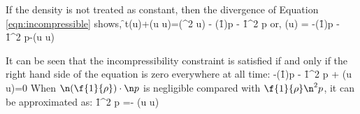 If the density is not treated as constant, then the divergence of Equation \ref{eqn:incompressible} shows,
\be
\f{\p }{\p t}(\di \+u)+\di (\+u \cdot \n \+u)=\nu \di (\n^2 \+u) - \n (\f{1}{\rho})\cdot \n p - \f{1}{\rho}\n^2 p
\ee
or,
\be
[\f{\p }{\p t}+\nu \n^2](\di \+u) = -\n (\f{1}{\rho})\cdot \n p - \f{1}{\rho}\n^2 p-\di (\+u \cdot \n \+u)
\ee

It can be seen that the incompressibility constraint is satisfied if and only if the right hand side of the equation is zero everywhere at all time:
\be
-\n (\f{1}{\rho})\cdot \n p - \f{1}{\rho}\n^2 p + \di (\+u \cdot \n \+u)=0
\ee
When $\n (\f{1}{\rho})\cdot \n p$ is negligible compared with $\f{1}{\rho}\n^2 p$, it can be approximated as:
\be
\f{1}{\rho}\n^2 p =- \di (\+u \cdot \n \+u)
\label{eqn:pressure-poisson}
\ee



